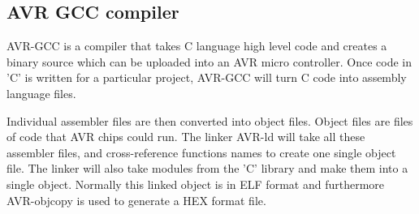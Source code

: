 \subsection{AVR GCC compiler}
AVR-GCC is a compiler that takes C language high level code and creates a binary source which can be uploaded into an AVR micro controller. Once code in 'C' is written for a particular project, AVR-GCC will turn C code into assembly language files. 

Individual assembler files are then converted into object files. Object files are files of code that AVR chips could run. The linker AVR-ld will take all these assembler files, and cross-reference functions names to create one single object file. The linker will also take modules from the 'C' library and make them into a single object. Normally this linked object is in ELF format and furthermore AVR-objcopy is used to generate a HEX format file.

